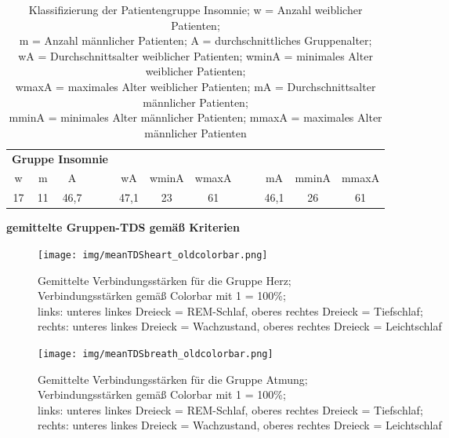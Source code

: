 \begin{table}[H] 
\centering
\begin{tabularx}{0.91\textwidth}{ccccccccccc}
\toprule
\multicolumn{4}{c}{\textbf{Gruppe Insomnie}} & & & & & & &\\  
\cmidrule{1-4}
w  & m  & A    &    & wA   & wminA & wmaxA &    & mA   & mminA & mmaxA\\
\midrule
17 & 11 & 46,7 & ~~ & 47,1 & 23    & 61    & ~~ & 46,1 & 26    & 61\\
\bottomrule
\end{tabularx}
\caption[Gruppe Insomnie]{Klassifizierung der Patientengruppe Insomnie; w = Anzahl weiblicher Patienten;\\m = Anzahl männlicher Patienten; A = durchschnittliches Gruppenalter;\\wA = Durchschnittsalter weiblicher Patienten; wminA = minimales Alter weiblicher Patienten;\\wmaxA = maximales Alter weiblicher Patienten; mA = Durchschnittsalter männlicher Patienten;\\mminA = minimales Alter männlicher Patienten; mmaxA = maximales Alter männlicher Patienten}
\label{tab:Insomnie}
\end{table}



\textbf{gemittelte Gruppen-TDS gemäß Kriterien}

\begin{figure}[H]
	\centering
	\texttt{[image: img/meanTDSheart\_oldcolorbar.png]}
	\caption[Verbindungsstärken für die Gruppe Herz]{Gemittelte Verbindungsstärken für die Gruppe Herz;\\Verbindungsstärken gemäß Colorbar mit 1 = 100\%;\\links: unteres linkes Dreieck = \acs{REM}-Schlaf, oberes rechtes Dreieck = Tiefschlaf;\\rechts: unteres linkes Dreieck = Wachzustand, oberes rechtes Dreieck = Leichtschlaf}
	\label{fig:meanTDSheart}
\end{figure}

\begin{figure}[H]
	\centering
	\texttt{[image: img/meanTDSbreath\_oldcolorbar.png]}
	\caption[Verbindungsstärken für die Gruppe Atmung]{Gemittelte Verbindungsstärken für die Gruppe Atmung;\\Verbindungsstärken gemäß Colorbar mit 1 = 100\%;\\links: unteres linkes Dreieck = \acs{REM}-Schlaf, oberes rechtes Dreieck = Tiefschlaf;\\rechts: unteres linkes Dreieck = Wachzustand, oberes rechtes Dreieck = Leichtschlaf}
	\label{fig:meanTDSbreath}
\end{figure}

